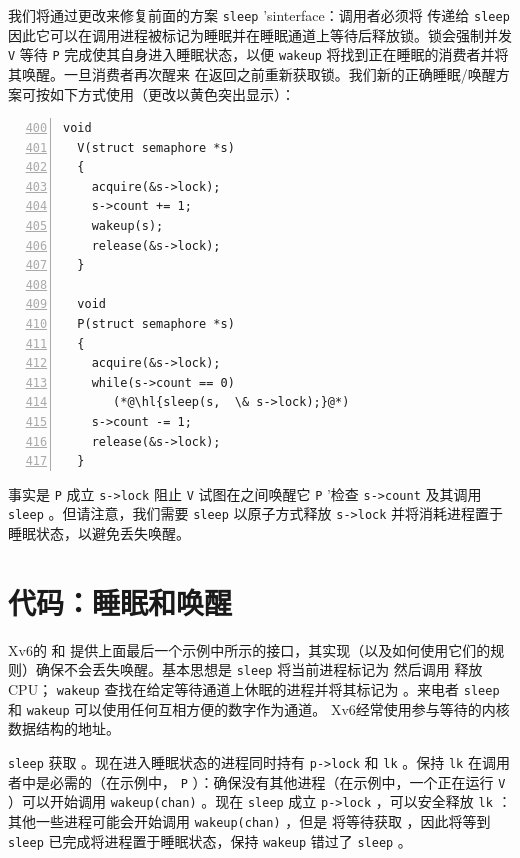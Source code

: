 我们将通过更改来修复前面的方案
    \lstinline{sleep}    'sinterface：调用者必须将        传递给
    \lstinline{sleep}    因此它可以在调用进程被标记为睡眠并在睡眠通道上等待后释放锁。锁会强制并发
    \lstinline{V}    等待    \lstinline{P}    完成使其自身进入睡眠状态，以便
    \lstinline{wakeup}   将找到正在睡眠的消费者并将其唤醒。一旦消费者再次醒来
        在返回之前重新获取锁。我们新的正确睡眠/唤醒方案可按如下方式使用（更改以黄色突出显示）：
    \begin{lstlisting}[numbers=left,firstnumber=400]
  void
  V(struct semaphore *s)
  {
    acquire(&s->lock);
    s->count += 1;
    wakeup(s);
    release(&s->lock);
  }

  void
  P(struct semaphore *s)
  {
    acquire(&s->lock);
    while(s->count == 0)
       (*@\hl{sleep(s,  \& s->lock);}@*)
    s->count -= 1;
    release(&s->lock);
  }
\end{lstlisting}     

事实是
    \lstinline{P}    成立
    \lstinline{s->lock}    阻止
    \lstinline{V}    试图在之间唤醒它
    \lstinline{P}   '检查
    \lstinline{s->count}    及其调用
    \lstinline{sleep}    。但请注意，我们需要
    \lstinline{sleep}    以原子方式释放
    \lstinline{s->lock}    并将消耗进程置于睡眠状态，以避免丢失唤醒。
    \section{代码：睡眠和唤醒  }     

Xv6的
        和
        提供上面最后一个示例中所示的接口，其实现（以及如何使用它们的规则）确保不会丢失唤醒。基本思想是
    \lstinline{sleep}    将当前进程标记为
        然后调用
        释放CPU；
    \lstinline{wakeup}    查找在给定等待通道上休眠的进程并将其标记为
        。来电者
    \lstinline{sleep}    和
    \lstinline{wakeup}    可以使用任何互相方便的数字作为通道。 Xv6经常使用参与等待的内核数据结构的地址。  

   \lstinline{sleep}    获取
        。现在进入睡眠状态的进程同时持有
    \lstinline{p->lock}    和
    \lstinline{lk}    。保持
    \lstinline{lk}    在调用者中是必需的（在示例中，
    \lstinline{P}    ）：确保没有其他进程（在示例中，一个正在运行
    \lstinline{V}    ）可以开始调用
    \lstinline{wakeup(chan)}    。现在
    \lstinline{sleep}    成立
    \lstinline{p->lock}    ，可以安全释放
    \lstinline{lk}    ：其他一些进程可能会开始调用
    \lstinline{wakeup(chan)}    ，但是
        将等待获取
        ，因此将等到
    \lstinline{sleep}    已完成将进程置于睡眠状态，保持
    \lstinline{wakeup}    错过了
    \lstinline{sleep}    。  


